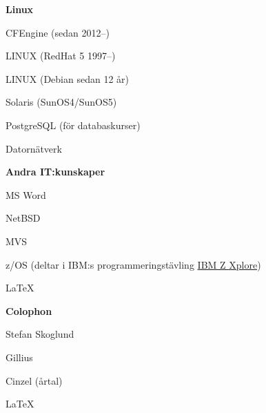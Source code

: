 \documentclass[a4paper,swedish,11pt]{article}
\begin{document}
\begin{minipage}[t]{0.73\textwidth}
  \textbf{Linux}
  \begin{description}[nosep,font=\sffamily\bfseries]
    \small%
  \item CFEngine (sedan 2012--)
  \item LINUX (RedHat 5 1997--)
  \item LINUX (Debian sedan 12 år)
  \item Solaris (SunOS4/SunOS5)
  \item PostgreSQL (för databaskurser)
  \item Datornätverk
  \end{description}

  \textbf{Andra IT:kunskaper}
  \begin{description}[nosep,itemsep=0.1ex]
  \item MS Word
  \item NetBSD
  \item MVS
  \item z/OS (deltar i IBM:s programmeringstävling \href{https://ibmzxplore.influitive.com/forum/}{IBM Z Xplore})
  \item \LaTeX
  \end{description}
\end{minipage}
\begin{minipage}[t]{0.24\textwidth}
  \vspace{20cm}
  \textbf{Colophon}
  \begin{description}[nosep,itemsep=0.1ex]
    \setlength\itemsep{0.1ex}\small%
    \raggedleft%
  \item Stefan Skoglund {}
  \item Gillius
  \item Cinzel (årtal)
  \item \LaTeX%
  \end{description}%
\end{minipage}%
\end{document}
